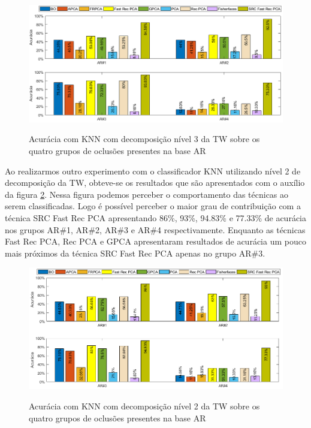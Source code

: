 \begin{figure}[H]
\centering
\caption{Acurácia com KNN com decomposição nível 3 da TW sobre os quatro grupos de oclusões presentes na base AR}
\includegraphics[scale=0.56]{imgs4/acuracia_subespaco_KNN}
\label{fig:acuracia_KNN_AR_4_grupos}
\end{figure}

Ao realizarmos outro experimento com o classificador KNN utilizando nível 2 de decomposição da TW, obteve-se os resultados que são apresentados com o auxílio da figura \ref{fig:acuracia_KNN_AR_4_grupos_nivel2}. Nessa figura podemos perceber o comportamento das técnicas ao serem classificadas. Logo é possível perceber o maior grau de contribuição com a técnica SRC Fast Rec PCA apresentando 86\%, 93\%, 94.83\% e 77.33\% de acurácia nos grupos AR\#1, AR\#2, AR\#3 e AR\#4 respectivamente. Enquanto as técnicas Fast Rec PCA, Rec PCA e GPCA apresentaram resultados de acurácia um pouco mais próximos da técnica SRC Fast Rec PCA apenas no grupo AR\#3.

\begin{figure}[H]
\centering
\caption{Acurácia com KNN com decomposição nível 2 da TW sobre os quatro grupos de oclusões presentes na base AR}
\includegraphics[scale=0.56]{imgs4/acuracia/nivel_one_two/KNNnivel2subespaco}
\label{fig:acuracia_KNN_AR_4_grupos_nivel2}
\end{figure}

